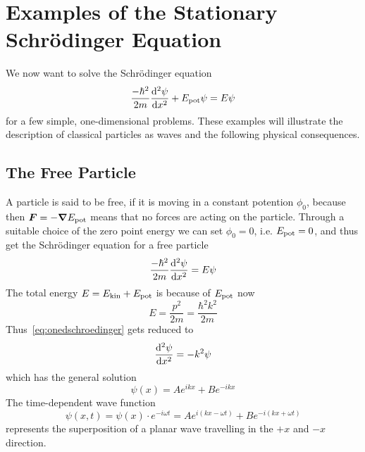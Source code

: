 \documentclass[../../script.tex]{subfiles}
\begin{document}
\section[Examples of the Stationary Schrödinger Equation]{Examples of the Stationary Schrödinger Equation}

We now want to solve the Schrödinger equation
\[
	\frac{-\hbar^2}{2m} \dv[2]{\psi}{x} + E_{\text{pot}}\psi = E\psi
\]
for a few simple, one-dimensional problems. These examples will illustrate the description of classical particles as waves and the following physical consequences.

\subsection{The Free Particle}

A particle is said to be free, if it is moving in a constant potention $\phi_0$, because then $\vec{F} = -\grad{\epot}$ means that no forces are acting on the particle. 
Through a suitable choice of the zero point energy we can set $\phi_0 = 0$, i.e. $E_{\text{pot}} = 0$, and thus get the Schrödinger equation for a free particle 
\begin{equation}\label{eq:onedschroedinger}
	\frac{-\hbar^2}{2m} \dv[2]{\psi}{x} = E\psi
\end{equation}
The total energy $E = E_{\text{kin}} + E_{\text{pot}}$ is because of $E_{\text{pot}}$ now 
\[
	E = \frac{p^2}{2m} = \frac{\hbar^2 k^2}{2m}
\]
Thus~\eqref{eq:onedschroedinger} gets reduced to 
\[
	\dv[2]{\psi}{x} = -k^2 \psi
\]
which has the general solution 
\begin{equation}\label{eq:onedsolution}
	\psi(x) = Ae^{ikx} + Be^{-ikx}
\end{equation}
The time-dependent wave function 
\begin{equation}\label{eq:onedsolutioncomplete}
	\psi(x, t) = \psi(x) \cdot e^{-i\omega t} = Ae^{i(kx - \omega t)} + Be^{-i(kx + \omega t)}
\end{equation}
represents the superposition of a planar wave travelling in the $+x$ and $-x$ direction.
\end{document}
